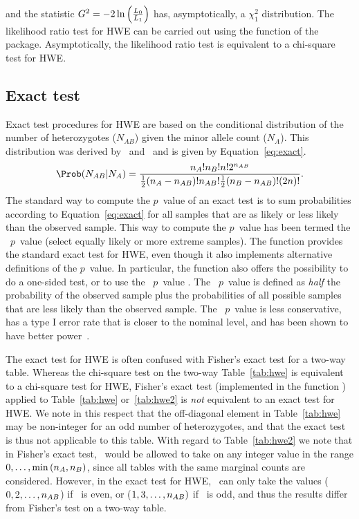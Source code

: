 \documentclass[nojss]{jss}
\begin{document}
and the statistic $G^2 = -2 \ln \left( \frac{L_0}{L_1} \right)$ has, asymptotically, a $\chi^2_1$ distribution.
The likelihood ratio test for HWE can be carried out using the
function  of the package. Asymptotically, the
likelihood ratio test is equivalent to a chi-square test for HWE.

\subsection{Exact test}
\label{subsec:exact}

Exact test procedures for HWE are based on the conditional
distribution of the number of heterozygotes ($N_{AB}$) given the minor allele
count ($N_A$). This distribution was derived by~\cite{Levene}
and~\cite{Haldane} and is given by Equation~\ref{eq:exact}.
\begin{equation}
\Prob({N_{AB}|N_A}) = \frac{n_A! n_B! n! 2^{n_{AB}}}
{\half(n_A - n_{AB})! n_{AB}! \half(n_B-n_{AB})! (2n)!}.
\label{eq:exact}
\end{equation}
The standard way to compute the $p$~value of an exact test is to sum
probabilities according to Equation~\ref{eq:exact} for all samples
that are as likely or less likely than the observed sample.  This way
to compute the $p$~value has been termed the \sel\ $p$~value (select equally
likely or more extreme samples).  The function  provides
the standard exact test for HWE, even though it also implements alternative
definitions of the $p$~value. In particular, the function also offers the
possibility to do a one-sided test, or to use the \midp\ $p$~value
\citep{Lancaster}. The \midp\ $p$~value is defined as {\it half} the
probability of the observed sample plus the probabilities of all
possible samples that are less likely than the observed sample. The
\midp\ $p$~value is less conservative, has a type I error rate that is
closer to the nominal level, and has been shown to
have better power~\citep{Graffel22}.

The exact test for HWE is often confused with Fisher's exact test for
a two-way table. Whereas the chi-square test on the two-way
Table~\ref{tab:hwe} is equivalent to a chi-square test for HWE,
Fisher's exact test (implemented in the  function
) applied to Table~\ref{tab:hwe} or~\ref{tab:hwe2}
is {\it not} equivalent to an exact test for HWE. We note in this
respect that the off-diagonal element in Table~\ref{tab:hwe} may be
non-integer for an odd number of heterozygotes, and that the exact
test is thus not applicable to this table. With regard to
Table~\ref{tab:hwe2} we note that in Fisher's exact test, \nab\ would
be allowed to take on any integer value in the range
$0,\ldots,\min{(\ensuremath{n_{A}},\ensuremath{n_{B}})}$, since all tables with the same marginal
counts are considered. However, in the exact test for HWE, \nab\ can
only take the values ($0,2,\ldots,n_{AB}$) if \na\ is even, or
($1,3,\ldots,n_{AB})$ if \na\ is odd, and thus the results differ from
Fisher's test on a two-way table.
\end{document}
